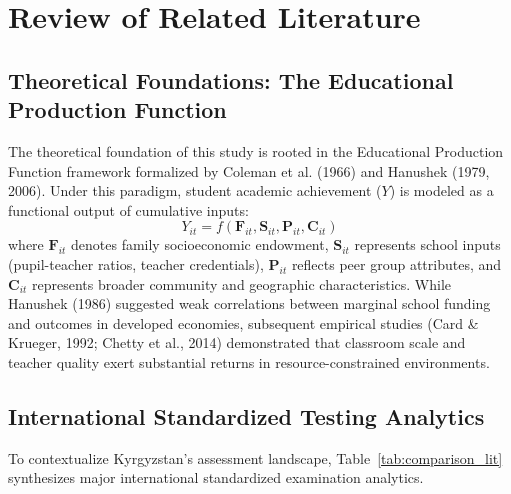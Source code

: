 \documentclass[12pt,letterpaper]{report}
\begin{document}
\chapter{Review of Related Literature}
\label{chap:rrl}

\section{Theoretical Foundations: The Educational Production Function}
The theoretical foundation of this study is rooted in the Educational Production Function framework formalized by Coleman et al. (1966) and Hanushek (1979, 2006). Under this paradigm, student academic achievement ($Y$) is modeled as a functional output of cumulative inputs:
\begin{equation}
    Y_{it} = f(\mathbf{F}_{it}, \mathbf{S}_{it}, \mathbf{P}_{it}, \mathbf{C}_{it})
\end{equation}
where $\mathbf{F}_{it}$ denotes family socioeconomic endowment, $\mathbf{S}_{it}$ represents school inputs (pupil-teacher ratios, teacher credentials), $\mathbf{P}_{it}$ reflects peer group attributes, and $\mathbf{C}_{it}$ represents broader community and geographic characteristics. While Hanushek (1986) suggested weak correlations between marginal school funding and outcomes in developed economies, subsequent empirical studies (Card \& Krueger, 1992; Chetty et al., 2014) demonstrated that classroom scale and teacher quality exert substantial returns in resource-constrained environments.

\section{International Standardized Testing Analytics}
To contextualize Kyrgyzstan's assessment landscape, Table~\ref{tab:comparison_lit} synthesizes major international standardized examination analytics.
\end{document}
